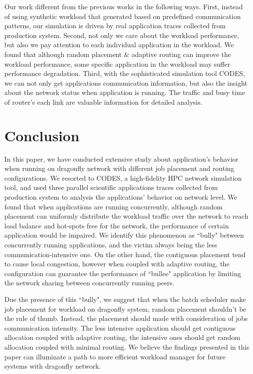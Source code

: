 \documentclass[conference,compsoc]{IEEEtran}
\begin{document}
Our work different from the previous works in the following ways. First, instead of using synthetic workload that generated based on predefined communication patterns, our simulation is driven by real application traces collected from production system. Second, not only we care about the workload performance, but also we pay attention to each individual application in the workload. We found that although random placement \& adaptive routing can improve the workload performance, some specific application in the workload may suffer performance degradation. Third, with the sophisticated simulation tool CODES, we can not only get applications communication information, but also the insight about the network status when application is running. The traffic and busy time of router's each link are valuable information for detailed analysis.

\section{Conclusion}
\label{sec:conclusion}

In this paper, we have conducted extensive study about application's behavior when running on dragonfly network with different job placement and routing configurations. We resorted to CODES, a high-fidelity HPC network simulation tool, and used three parallel scientific applications traces collected from production system to analysis the applications' behavior on network level. We found that when applications are running concurrently, although random placement can uniformly distribute the workload traffic over the network to reach load balance and hot-spots free for the network, the performance of certain application would be impaired. We identify this phenomenon as ``bully" between concurrently running applications, and the victim always being the less communication-intensive one. On the other hand, the contiguous placement tend to cause local congestion, however when coupled with adaptive routing, the configuration can guarantee the performance of ``bullee" application by limiting the network sharing between concurrently running peers. 

Due the presence of this ``bully", we suggest that when the batch scheduler make job placement for workload on dragonfly system, random placement shouldn't be the rule of thumb. Instead, the placement should made with consideration of jobs communication intensity. The less intensive application should get contiguous allocation coupled with adaptive routing, the intensive ones should get random allocation coupled with minimal routing. We believe the findings presented in this paper can illuminate a path to more efficient workload manager for future systems with dragonfly network.
\end{document}
